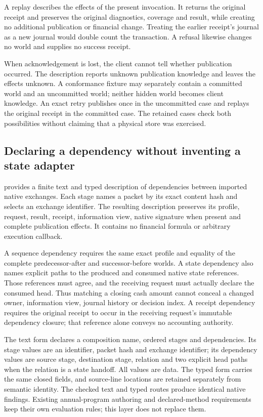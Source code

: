 A replay describes the effects of the present invocation. It returns the
original receipt and preserves the original diagnostics, coverage and result,
while creating no additional publication or financial change. Treating the
earlier receipt's journal as a new journal would double count the transaction.
A refusal likewise changes no world and supplies no success receipt.

When acknowledgement is lost, the client cannot tell whether publication
occurred. The description reports unknown publication knowledge and leaves the
effects unknown. A conformance fixture may separately contain a committed world
and an uncommitted world; neither hidden world becomes client knowledge. An exact
retry publishes once in the uncommitted case and replays the original receipt
in the committed case. The retained cases check both possibilities without
claiming that a physical store was exercised.



\subsection{Declaring a dependency without inventing a state adapter}

 provides a finite text and typed description
of dependencies between imported native exchanges. Each stage names a packet
by its exact content hash and selects an exchange identifier. The resulting
description preserves its profile, request, result, receipt, information view,
native signature when present and complete publication effects. It contains no
financial formula or arbitrary execution callback.

A sequence dependency requires the same exact profile and equality of the
complete predecessor-after and successor-before worlds. A state dependency also
names explicit paths to the produced and consumed native state references.
Those references must agree, and the receiving request must actually declare
the consumed head. Thus matching a closing cash amount cannot conceal a changed
owner, information view, journal history or decision index. A receipt dependency
requires the original receipt to occur in the receiving request's immutable
dependency closure; that reference alone conveys no accounting authority.

The text form declares a composition name, ordered stages and dependencies.
Its stage values are an identifier, packet hash and exchange identifier; its
dependency values are source stage, destination stage, relation and two explicit
head paths when the relation is a state handoff. All values are data. The typed
form carries the same closed fields, and source-line locations are retained
separately from semantic identity. The checked text and typed routes produce
identical native findings. Existing annual-program authoring and declared-method
requirements keep their own evaluation rules; this layer does not replace them.

